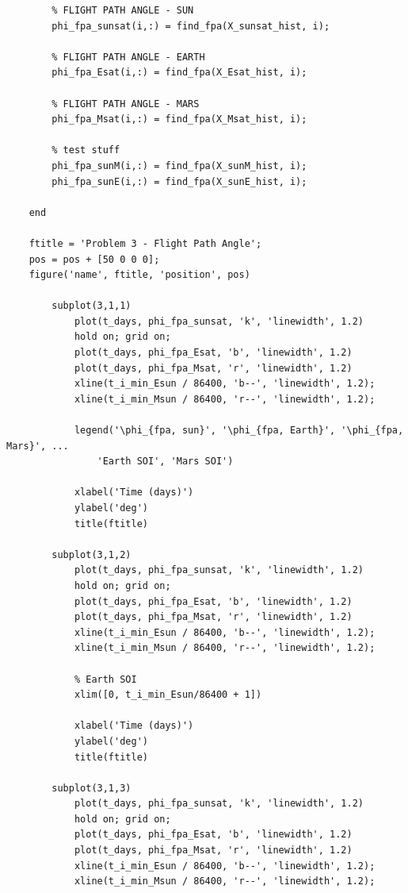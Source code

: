 \documentclass[conf]{new-aiaa}
\begin{document}
\begin{lstlisting}
        % FLIGHT PATH ANGLE - SUN 
        phi_fpa_sunsat(i,:) = find_fpa(X_sunsat_hist, i); 
            
        % FLIGHT PATH ANGLE - EARTH 
        phi_fpa_Esat(i,:) = find_fpa(X_Esat_hist, i); 
            
        % FLIGHT PATH ANGLE - MARS
        phi_fpa_Msat(i,:) = find_fpa(X_Msat_hist, i); 
        
        % test stuff 
        phi_fpa_sunM(i,:) = find_fpa(X_sunM_hist, i); 
        phi_fpa_sunE(i,:) = find_fpa(X_sunE_hist, i); 
        
    end 
    
    ftitle = 'Problem 3 - Flight Path Angle'; 
    pos = pos + [50 0 0 0]; 
    figure('name', ftitle, 'position', pos)
    
        subplot(3,1,1) 
            plot(t_days, phi_fpa_sunsat, 'k', 'linewidth', 1.2) 
            hold on; grid on; 
            plot(t_days, phi_fpa_Esat, 'b', 'linewidth', 1.2) 
            plot(t_days, phi_fpa_Msat, 'r', 'linewidth', 1.2) 
            xline(t_i_min_Esun / 86400, 'b--', 'linewidth', 1.2); 
            xline(t_i_min_Msun / 86400, 'r--', 'linewidth', 1.2); 
      
            legend('\phi_{fpa, sun}', '\phi_{fpa, Earth}', '\phi_{fpa, Mars}', ... 
                'Earth SOI', 'Mars SOI')
    
            xlabel('Time (days)') 
            ylabel('deg') 
            title(ftitle) 
    
        subplot(3,1,2) 
            plot(t_days, phi_fpa_sunsat, 'k', 'linewidth', 1.2) 
            hold on; grid on; 
            plot(t_days, phi_fpa_Esat, 'b', 'linewidth', 1.2) 
            plot(t_days, phi_fpa_Msat, 'r', 'linewidth', 1.2) 
            xline(t_i_min_Esun / 86400, 'b--', 'linewidth', 1.2); 
            xline(t_i_min_Msun / 86400, 'r--', 'linewidth', 1.2); 
    
            % Earth SOI 
            xlim([0, t_i_min_Esun/86400 + 1])
    
            xlabel('Time (days)') 
            ylabel('deg') 
            title(ftitle) 
    
        subplot(3,1,3) 
            plot(t_days, phi_fpa_sunsat, 'k', 'linewidth', 1.2) 
            hold on; grid on; 
            plot(t_days, phi_fpa_Esat, 'b', 'linewidth', 1.2) 
            plot(t_days, phi_fpa_Msat, 'r', 'linewidth', 1.2) 
            xline(t_i_min_Esun / 86400, 'b--', 'linewidth', 1.2); 
            xline(t_i_min_Msun / 86400, 'r--', 'linewidth', 1.2); 
    

\end{lstlisting}
\end{document}
